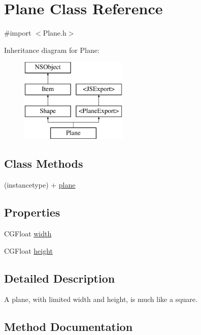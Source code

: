 \hypertarget{interface_plane}{}\section{Plane Class Reference}
\label{interface_plane}


{\ttfamily \#import $<$Plane.\+h$>$}

Inheritance diagram for Plane\+:\begin{figure}[H]
\begin{center}
\leavevmode
\includegraphics[height=4.000000cm]{interface_plane}
\end{center}
\end{figure}
\subsection*{Class Methods}
\begin{DoxyCompactItemize}
\item 
(instancetype) + \hyperlink{interface_plane_a2d3518c82e698f2115c217549615c5fe}{plane}
\end{DoxyCompactItemize}
\subsection*{Properties}
\begin{DoxyCompactItemize}
\item 
C\+G\+Float \hyperlink{interface_plane_a9864aecb8f3475b4042e6960bef666d1}{width}
\item 
C\+G\+Float \hyperlink{interface_plane_a9c9596b27e3befbbc33fb1d23c0aa2da}{height}
\end{DoxyCompactItemize}


\subsection{Detailed Description}
A plane, with limited width and height, is much like a square. 

\subsection{Method Documentation}
\hypertarget{interface_plane_a2d3518c82e698f2115c217549615c5fe}{}
